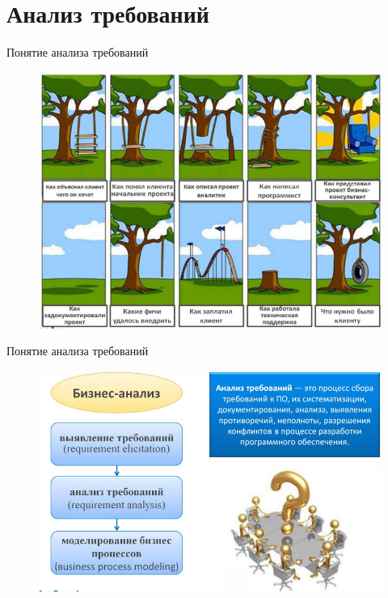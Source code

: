 \documentclass{beamer}
\begin{document}
\section{Анализ требований}

\begin{frame}[t]{Понятие анализа требований}
\begin{figure}[h]
\centering
\includegraphics[scale=0.5]{images/lec02-pic06.png}
\end{figure}
\end{frame} 

\begin{frame}[t]{Понятие анализа требований}
\begin{figure}[h]
\centering
\includegraphics[scale=0.5]{images/lec02-pic07.png}
\end{figure}
\end{frame} 
\end{document}
